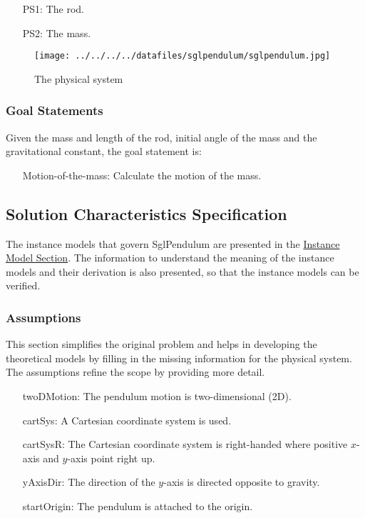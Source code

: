\documentclass[12pt]{article}
\begin{document}
\begin{itemize}
\item[PS1:]{The rod.}
\item[PS2:]{The mass.}
\end{itemize}
\begin{figure}
\begin{center}
\texttt{[image: ../../../../datafiles/sglpendulum/sglpendulum.jpg]}
\caption{The physical system}
\label{Figure:sglpendulum}
\end{center}
\end{figure}
\subsubsection{Goal Statements}
\label{Sec:GoalStmt}
Given the mass and length of the rod, initial angle of the mass and the gravitational constant, the goal statement is:

\begin{itemize}
\item[Motion-of-the-mass:\phantomsection\label{motionMass}]{Calculate the motion of the mass.}
\end{itemize}
\subsection{Solution Characteristics Specification}
\label{Sec:SolCharSpec}
The instance models that govern SglPendulum are presented in the \hyperref[Sec:IMs]{Instance Model Section}. The information to understand the meaning of the instance models and their derivation is also presented, so that the instance models can be verified.

\subsubsection{Assumptions}
\label{Sec:Assumps}
This section simplifies the original problem and helps in developing the theoretical models by filling in the missing information for the physical system. The assumptions refine the scope by providing more detail.

\begin{itemize}
\item[twoDMotion:\phantomsection\label{twoDMotion}]{The pendulum motion is two-dimensional (2D).}
\item[cartSys:\phantomsection\label{cartSys}]{A Cartesian coordinate system is used.}
\item[cartSysR:\phantomsection\label{cartSysR}]{The Cartesian coordinate system is right-handed where positive $x$-axis and $y$-axis point right up.}
\item[yAxisDir:\phantomsection\label{yAxisDir}]{The direction of the $y$-axis is directed opposite to gravity.}
\item[startOrigin:\phantomsection\label{startOrigin}]{The pendulum is attached to the origin.}
\end{itemize}
\end{document}
